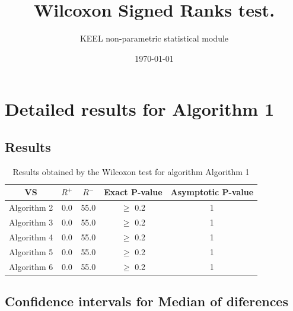 \documentclass[a4paper,10pt]{article}
\title{Wilcoxon Signed Ranks test.}
\date{\today}
\author{KEEL non-parametric statistical module}
\begin{document}
\pagestyle{empty}
\maketitle
\thispagestyle{empty}



\section{Detailed results for Algorithm 1}


\subsection{Results}

\begin{table}[!htp]
\centering\small
\begin{tabular}{
|c|c|c|c|c|}
\hline
 VS & $R^{+}$ & $R^{-}$ & Exact P-value & Asymptotic P-value \\ \hline 
Algorithm 2 & 0.0 & 55.0 & $\geq$ 0.2 & 1\\ \hline 
Algorithm 3 & 0.0 & 55.0 & $\geq$ 0.2 & 1\\ \hline 
Algorithm 4 & 0.0 & 55.0 & $\geq$ 0.2 & 1\\ \hline 
Algorithm 5 & 0.0 & 55.0 & $\geq$ 0.2 & 1\\ \hline 
Algorithm 6 & 0.0 & 55.0 & $\geq$ 0.2 & 1\\ \hline 

\end{tabular}
\caption{Results obtained by the Wilcoxon test for algorithm Algorithm 1}
\end{table}

\subsection{Confidence intervals for Median of diferences}
\end{document}

